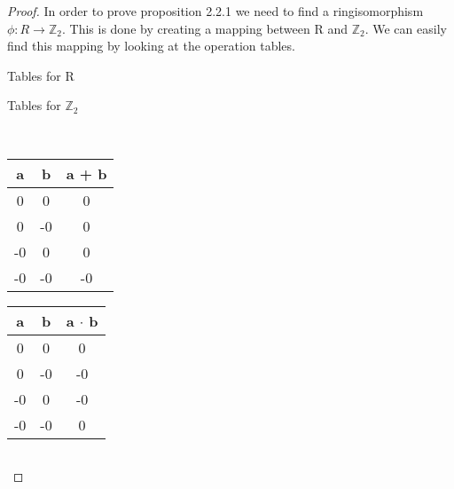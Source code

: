 \documentclass[12pt]{report}
\theoremstyle{definition}
\theoremstyle{remark}
\begin{document}
    \newpage
    \begin{proof}
      In order to prove proposition 2.2.1 we need to find a ringisomorphism
      $\phi:R\rightarrow\mathbb{Z}_2$. This is done by creating a mapping between R
      and $\mathbb{Z}_2$. We can easily find this mapping by looking at the operation tables.\\

      \begin{minipage}{206pt}
        Tables for R
      \end{minipage}
      \begin{minipage}{\textwidth}
        Tables for $\mathbb{Z}_2$
      \end{minipage}\\

      \begin{minipage}{0.2\textwidth}
        \begin{center}
          \begin{tabular}{| c | c || c |} \hline
            a & b & a + b \\ \hline
            0 & 0 & 0 \\ \hline
            0 & -0 & 0 \\ \hline
            -0 & 0 & 0 \\ \hline
            -0 & -0 & -0 \\ \hline
          \end{tabular}
        \end{center}
      \end{minipage}
      \begin{minipage}{0.2\textwidth}
        \begin{center}
          \begin{tabular}{| c | c || c |} \hline
            a & b & a $\cdot$ b \\ \hline
            0 & 0 & 0 \\ \hline
            0 & -0 & -0 \\ \hline
            -0 & 0 & -0 \\ \hline
            -0 & -0 & 0 \\ \hline
          \end{tabular}
        \end{center}
      \end{minipage}
      \begin{minipage}{0.2\textwidth}
        \begin{center}
          \begin{tabular}{| c | c || c |} \hline

\end{tabular}
\end{center}
\end{minipage}
\end{proof}
\end{document}
